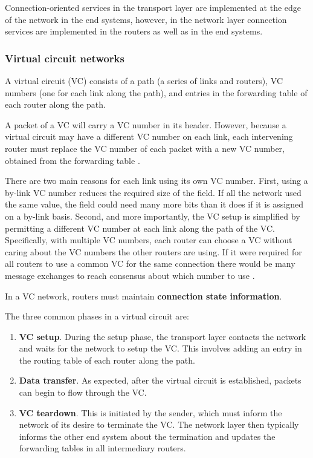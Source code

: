 Connection-oriented services in the transport layer are implemented at the edge of the network in the end systems, however, in the network layer connection services are implemented in the routers as well as in the end systems.

\subsubsection{Virtual circuit networks}

A virtual circuit (VC) consists of a path (a series of links and routers), VC numbers (one for each link along the path), and entries in the forwarding table of each router along the path.

A packet of a VC will carry a VC number in its header. However, because a virtual circuit may have a different VC number on each link, each intervening router must replace the VC number of each packet with a new VC number, obtained from the forwarding table \cite[p.~314]{computer-networking-kurose-2012}.

There are two main reasons for each link using its own VC number. First, using a by-link VC number reduces the required size of the field. If all the network used the same value, the field could need many more bits than it does if it is assigned on a by-link basis. Second, and more importantly, the VC setup is simplified by permitting a different VC number at each link along the path of the VC. Specifically, with multiple VC numbers, each router can choose a VC without caring about the VC numbers the other routers are using. If it were required for all routers to use a common VC for the same connection there would be many message exchanges to reach consensus about which number to use \cite[p.~315]{computer-networking-kurose-2012}.

In a VC network, routers must maintain \textbf{connection state information}.

The three common phases in a virtual circuit are:
\begin{enumerate}
    \item \textbf{VC setup}. During the setup phase, the transport layer contacts the network and waits for the network to setup the VC. This involves adding an entry in the routing table of each router along the path.
    \item \textbf{Data transfer}. As expected, after the virtual circuit is established, packets can begin to flow through the VC.
    \item \textbf{VC teardown}. This is initiated by the sender, which must inform the network of its desire to terminate the VC. The network layer then typically informs the other end system about the termination and updates the forwarding tables in all intermediary routers.
\end{enumerate}

